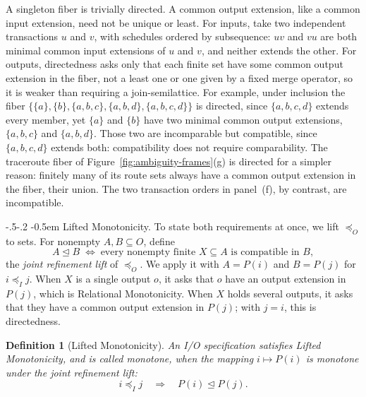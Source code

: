 \documentclass[sigconf]{cidr-2027}
\makeatletter
\newtheorem{definition}{Definition}
\theoremstyle{remark}
\renewcommand\paragraph{\@startsection{paragraph}{4}{\z@}%
  {-.5\baselineskip \@plus -2\p@ \@minus -.2\p@}%
  {-0.5em}%
  {\normalfont\bfseries}}
\newcommand{\InputOrd}{\preceq_I}
\newcommand{\OutputOrd}{\preceq_O}
\newcommand{\LiftedOrd}{\trianglelefteq}
\newcommand{\inrel}{extends\xspace}          %
\newcommand{\indesc}{input extension\xspace} %
\newcommand{\indescs}{input extensions\xspace}
\newcommand{\outrel}{extends\xspace}          %
\newcommand{\outnoun}{output extension\xspace}%
\newcommand{\outnouns}{output extensions\xspace}
\newcommand{\spectype}[1][]{I/O specification#1\xspace}
\newcommand{\fiber}[1]{P(#1)}
\makeatother
\begin{document}
\color{blue!70!black}A singleton fiber is trivially directed.  A common \outnoun, like a common
\indesc, need not be unique or least.  For inputs, take two independent
transactions $u$ and $v$, with schedules ordered by subsequence: $uv$ and $vu$
are both minimal common \indescs of $u$ and $v$, and neither \inrel the other.
For outputs, directedness asks only that each finite set have some common
\outnoun in the fiber, not a least one or one given by a fixed merge operator,
so it is weaker than requiring a join-semilattice.  For example, under
inclusion the fiber $\{\{a\},\{b\},\{a,b,c\},\{a,b,d\},\{a,b,c,d\}\}$ is
directed, since $\{a,b,c,d\}$ \outrel every member, yet $\{a\}$ and $\{b\}$
have two minimal common \outnouns, $\{a,b,c\}$ and $\{a,b,d\}$.  Those two are
incomparable but compatible, since $\{a,b,c,d\}$ \outrel both: compatibility
does not require comparability.  The traceroute fiber of
Figure~\ref{fig:ambiguity-frames}(g) is directed for a simpler reason: finitely
many of its route sets always have a common \outnoun in the fiber, their union.
The two transaction orders in panel~(f), by contrast, are incompatible.\color{black}

\paragraph{Lifted Monotonicity.}
\color{blue!70!black}To state both requirements at once, we lift $\OutputOrd$ to sets.  For nonempty
$A,B\subseteq O$, define
        \begin{equation}
  A\LiftedOrd B
  \;\Longleftrightarrow\;
  \text{every nonempty finite }X\subseteq A\text{ is compatible in }B,
  \label{eq:joint-output-order}
        \end{equation}
the \emph{joint refinement lift} of $\OutputOrd$.  We apply it with $A=\fiber{i}$ and
$B=\fiber{j}$ for $i\InputOrd j$.  When $X$ is a single output $o$, it asks
that $o$ have an \outnoun in $\fiber{j}$, which is Relational Monotonicity.
When $X$ holds several outputs, it asks that they have a common \outnoun in
$\fiber{j}$; with $j=i$, this is directedness.\color{black}

\begin{definition}[Lifted Monotonicity]
\label{def:lifted-monotonicity}
An \spectype satisfies \emph{Lifted Monotonicity}, and
is called \emph{monotone}, when the mapping $i\mapsto\fiber{i}$ is monotone
under the joint refinement lift:
        \begin{equation}
  i\InputOrd j
  \quad\Longrightarrow\quad
  \fiber{i}\LiftedOrd\fiber{j}.
  \label{eq:lifted-monotonicity}
        \end{equation}
\end{definition}
\end{document}
